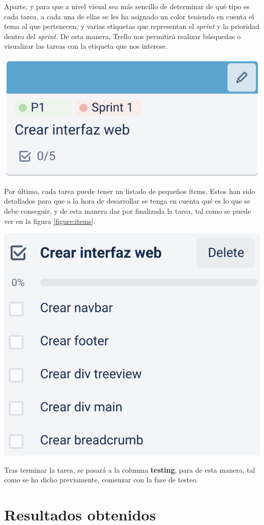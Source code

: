 \documentclass{\ClassPath/viu-tfm-template}
\begin{document}

Aparte, y para que a nivel visual sea más sencillo de determinar de qué tipo es cada tarea, a cada una de ellas se les ha asignado un color teniendo en cuenta el tema al que pertenecen, y varias etiquetas que representan el \textit{sprint} y la prioridad dentro del \textit{sprint}. De esta manera, Trello nos permitirá realizar búsquedas o visualizar las tareas con la etiqueta que nos interese.


\begin{center}
    \includegraphics[width=0.5\linewidth]{img/tarea.png}
\end{center}



Por último, cada tarea puede tener un listado de pequeños ítems. Estos han sido detallados para que a la hora de desarrollar se tenga en cuenta qué es lo que se debe conseguir, y de esta manera dar por finalizada la tarea, tal como se puede ver en la figura \ref{figure:items}.
\begin{center}
    \includegraphics[width=0.4\linewidth]{img/tarea1.png}
    \label{figure:items}
\end{center}

Tras terminar la tarea, se pasará a la columna \textbf{testing}, para de esta manera, tal como se ha dicho previamente, comenzar con la fase de testeo.



\chapter{Resultados obtenidos}
\end{document}
